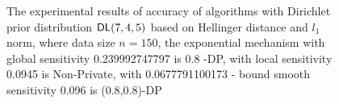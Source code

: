 \begin{figure}
\begin{center}
\centering
\caption{The experimental results of accuracy of algorithms with Dirichlet prior distribution $\mathsf{DL}(7, 4, 5)$ based on Hellinger distance and $l_1$  norm, where data size $n = 150$, the exponential mechanism with global sensitivity 0.239992747797 is 0.8 -DP, with local sensitivity 0.0945 is Non-Private, with 0.0677791100173 - bound smooth sensitivity 0.096 is (0.8,0.8)-DP}
\label{fig_dirichlet_hellinger_l1}
\end{center}
\end{figure}

\printbibliography



